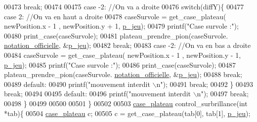 \begin{DoxyCode}
00473                         \textcolor{keywordflow}{break};
00474 
00475                 \textcolor{keywordflow}{case} -2: \textcolor{comment}{//On va a droite}
00476                         \textcolor{keywordflow}{switch}(diffY)\{
00477                         \textcolor{keywordflow}{case} 2: \textcolor{comment}{//On va en haut a droite}
00478                                 caseSurvole = get\_case\_plateau( newPosition.x - 1
      , newPosition.y + 1, \hyperlink{moteur_8h_a3efa8d0f7c65daedc584dc8db048e62c}{p_jeu});
00479                                 printf(\textcolor{stringliteral}{"Case survole :"});
00480                                 print\_case(caseSurvole);
00481                                 plateau\_prendre\_pion(caseSurvole.
      \hyperlink{structcase__plateau_ad510581b324604a9cf685cbb769a421a}{notation_officielle}, &\hyperlink{moteur_8h_a3efa8d0f7c65daedc584dc8db048e62c}{p_jeu});
00482                                 \textcolor{keywordflow}{break};
00483                         \textcolor{keywordflow}{case} -2: \textcolor{comment}{//On va en bas a droite}
00484                                 caseSurvole = get\_case\_plateau( newPosition.x - 1
      , newPosition.y - 1, \hyperlink{moteur_8h_a3efa8d0f7c65daedc584dc8db048e62c}{p_jeu});
00485                                 printf(\textcolor{stringliteral}{"Case survole :"});
00486                                 print\_case(caseSurvole);
00487                                 plateau\_prendre\_pion(caseSurvole.
      \hyperlink{structcase__plateau_ad510581b324604a9cf685cbb769a421a}{notation_officielle}, &\hyperlink{moteur_8h_a3efa8d0f7c65daedc584dc8db048e62c}{p_jeu});
00488                                 \textcolor{keywordflow}{break};
00489                         \textcolor{keywordflow}{default}:
00490                                 printf(\textcolor{stringliteral}{"mouvement interdit \(\backslash\)n"});
00491                                 \textcolor{keywordflow}{break};
00492                         \}
00493                         \textcolor{keywordflow}{break};
00494 
00495                 \textcolor{keywordflow}{default}:
00496                         printf(\textcolor{stringliteral}{"mouvement interdit \(\backslash\)n"});
00497                         \textcolor{keywordflow}{break};
00498                 \}
00499 
00500 
00501 \}
00502 
00503 \hyperlink{structcase__plateau}{case_plateau} control\_surbrillance(\textcolor{keywordtype}{int} *tab)\{
00504         \hyperlink{structcase__plateau}{case_plateau} c;
00505         c = get\_case\_plateau(tab[0], tab[1], \hyperlink{moteur_8h_a3efa8d0f7c65daedc584dc8db048e62c}{p_jeu});

\end{DoxyCode}
